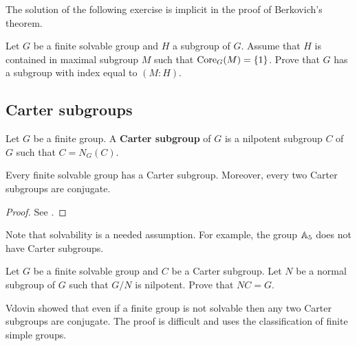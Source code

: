 The solution of the following exercise is implicit in 
the proof of Berkovich's theorem. 

\begin{exercise}
\label{xca:corefree_maximal}
    Let $G$ be a finite solvable group and $H$ a subgroup of $G$. 
    Assume that $H$ is contained in maximal subgroup $M$ such that $\operatorname{Core}_G(M)=\{1\}$. 
    Prove that $G$ has a subgroup with index equal to $(M:H)$. 
\end{exercise}

\subsection{Carter subgroups}

\begin{definition}
    Let $G$ be a finite group. A \textbf{Carter subgroup} of $G$ 
    is a nilpotent subgroup $C$ of $G$ such that 
    $C=N_G(C)$. 
\end{definition}

\begin{theorem}[Carter]
    \label{thm:Carter}
    Every finite solvable group has a Carter subgroup. Moreover, 
    every two Carter subgroups are conjugate. 
\end{theorem}

\begin{proof}
    See \cite{MR0123603}. 
\end{proof}

Note that solvability is a needed assumption. For example, the
group $\mathbb{A}_5$ does not have Carter subgroups. 

\begin{exercise}
    Let $G$ be a finite solvable group and $C$ be a Carter subgroup. Let $N$ be a normal
    subgroup of $G$ such that $G/N$ is nilpotent. Prove that $NC=G$. 
\end{exercise}

Vdovin showed that even 
if a finite group is not solvable then any two Carter subgroups are conjugate. The proof is difficult and uses the classification of finite simple groups. 
